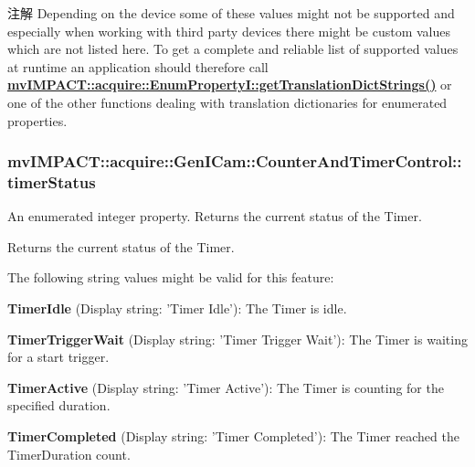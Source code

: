 \begin{DoxyNote}{注解}
Depending on the device some of these values might not be supported and especially when working with third party devices there might be custom values which are not listed here. To get a complete and reliable list of supported values at runtime an application should therefore call {\bfseries \hyperlink{classmv_i_m_p_a_c_t_1_1acquire_1_1_enum_property_i_a0ba6ccbf5ee69784d5d0b537924d26b6}{mv\+I\+M\+P\+A\+C\+T\+::acquire\+::\+Enum\+Property\+I\+::get\+Translation\+Dict\+Strings()}} or one of the other functions dealing with translation dictionaries for enumerated properties. 
\end{DoxyNote}
\hypertarget{classmv_i_m_p_a_c_t_1_1acquire_1_1_gen_i_cam_1_1_counter_and_timer_control_a119e611c5ad880862fd3194de9f63c61}{
\subsubsection[{timer\+Status}]{ mv\+I\+M\+P\+A\+C\+T\+::acquire\+::\+Gen\+I\+Cam\+::\+Counter\+And\+Timer\+Control\+::timer\+Status}}\label{classmv_i_m_p_a_c_t_1_1acquire_1_1_gen_i_cam_1_1_counter_and_timer_control_a119e611c5ad880862fd3194de9f63c61}


An enumerated integer property. Returns the current status of the Timer. 

Returns the current status of the Timer.

The following string values might be valid for this feature\+:
\begin{DoxyItemize}
\item {\bfseries Timer\+Idle} (Display string\+: 'Timer Idle')\+: The Timer is idle.
\item {\bfseries Timer\+Trigger\+Wait} (Display string\+: 'Timer Trigger Wait')\+: The Timer is waiting for a start trigger.
\item {\bfseries Timer\+Active} (Display string\+: 'Timer Active')\+: The Timer is counting for the specified duration.
\item {\bfseries Timer\+Completed} (Display string\+: 'Timer Completed')\+: The Timer reached the Timer\+Duration count.
\end{DoxyItemize}

